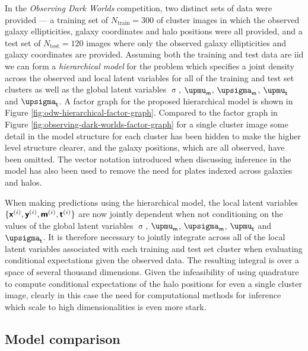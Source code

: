 In the \emph{Observing Dark Worlds} competition, two distinct sets of data were provided --- a training set of $N_{\textrm{train}} = 300$ of cluster images in which the observed galaxy ellipticities, galaxy coordinates and halo positions were all provided, and a test set of $N_{\textrm{test}} = 120$ images where only the observed galaxy ellipticities and galaxy coordinates are provided. Assuming both the training and test data are \ac{iid} we can form a \emph{hierarchical model} for the problem which specifies a joint density across the observed and local latent variables for all of the training and test set clusters as well as the global latent variables $\upsigma$, $\upmu_{\rvar{m}}$, $\upsigma_{\rvar{m}}$, $\upmu_{\rvar{t}}$ and $\upsigma_{\rvar{t}}$. A factor graph for the proposed hierarchical model is shown in Figure \ref{fig:odw-hierarchical-factor-graph}. Compared to the factor graph in Figure \ref{fig:observing-dark-worlds-factor-graph} for a single cluster image some detail in the model structure for each cluster has been hidden to make the higher level structure clearer, and the galaxy positions, which are all observed, have been omitted. The vector notation introduced when discussing inference in the model has also been used to remove the need for plates indexed across galaxies and halos.

When making predictions using the hierarchical model, the local latent variables $\lbrace \boldsymbol{\mathsf{x}}^{(i)}, \boldsymbol{\mathsf{y}}^{(i)},\boldsymbol{\mathsf{m}}^{(i)},\boldsymbol{\mathsf{t}}^{(i)} \rbrace$ are now jointly dependent when not conditioning on the values of the global latent variables $\upsigma$, $\upmu_{\rvar{m}}$, $\upsigma_{\rvar{m}}$, $\upmu_{\rvar{t}}$ and $\upsigma_{\rvar{t}}$. It is therefore necessary to jointly integrate across all of the local latent variables associated with each training and test set cluster when evaluating conditional expectations given the observed data. The resulting integral is over a space of several thousand dimensions. Given the infeasibility of using quadrature to compute conditional expectations of the halo positions for even a single cluster image, clearly in this case the need for computational methods for inference which scale to high dimensionalities is even more stark.


\subsection{Model comparison}

